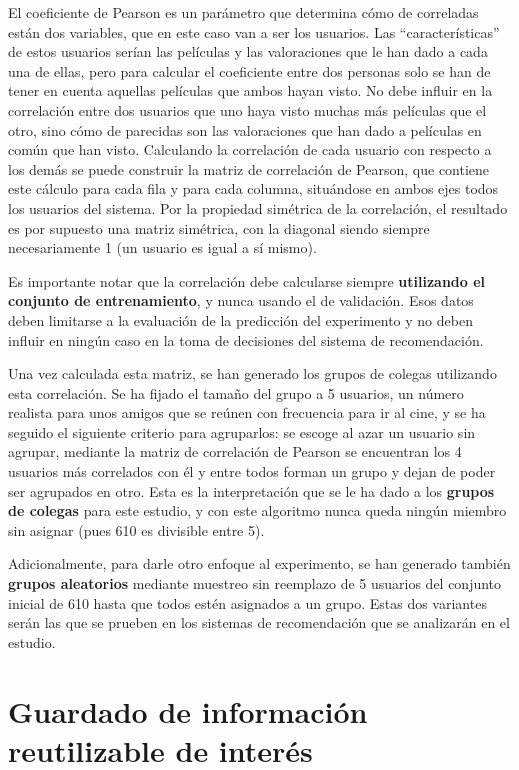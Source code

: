 El coeficiente de Pearson es un parámetro que determina cómo de correladas están dos variables, que en este caso van a ser los usuarios. Las ``características'' de estos usuarios serían las películas y las valoraciones que le han dado a cada una de ellas, pero para calcular el coeficiente entre dos personas solo se han de tener en cuenta aquellas películas que ambos hayan visto. No debe influir en la correlación entre dos usuarios que uno haya visto muchas más películas que el otro, sino cómo de parecidas son las valoraciones que han dado a películas en común que han visto. Calculando la correlación de cada usuario con respecto a los demás se puede construir la matriz de correlación de Pearson, que contiene este cálculo para cada fila y para cada columna, situándose en ambos ejes todos los usuarios del sistema. Por la propiedad simétrica de la correlación, el resultado es por supuesto una matriz simétrica, con la diagonal siendo siempre necesariamente 1 (un usuario es igual a sí mismo).

Es importante notar que la correlación debe calcularse siempre \textbf{utilizando el conjunto de entrenamiento}, y nunca usando el de validación. Esos datos deben limitarse a la evaluación de la predicción del experimento y no deben influir en ningún caso en la toma de decisiones del sistema de recomendación.

Una vez calculada esta matriz, se han generado los grupos de colegas utilizando esta correlación. Se ha fijado el tamaño del grupo a 5 usuarios, un número realista para unos amigos que se reúnen con frecuencia para ir al cine, y se ha seguido el siguiente criterio para agruparlos: se escoge al azar un usuario sin agrupar, mediante la matriz de correlación de Pearson se encuentran los 4 usuarios más correlados con él y entre todos forman un grupo y dejan de poder ser agrupados en otro. Esta es la interpretación que se le ha dado a los \textbf{grupos de colegas} para este estudio, y con este algoritmo nunca queda ningún miembro sin asignar (pues 610 es divisible entre 5).

Adicionalmente, para darle otro enfoque al experimento, se han generado también \textbf{grupos aleatorios} mediante muestreo sin reemplazo de 5 usuarios del conjunto inicial de 610 hasta que todos estén asignados a un grupo. Estas dos variantes serán las que se prueben en los sistemas de recomendación que se analizarán en el estudio.

\section{Guardado de información reutilizable de interés}

